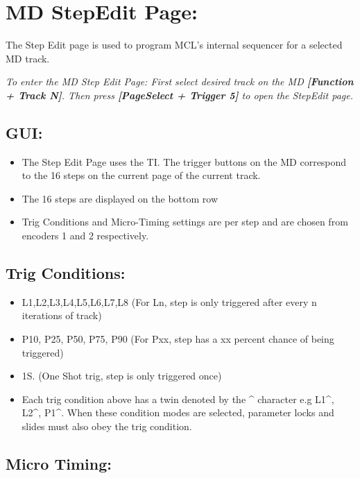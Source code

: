 \chapter{MD StepEdit Page:}

The Step Edit page is used to program MCL's internal sequencer for a selected MD track. 

\textit{To enter the MD Step Edit Page: First select desired track on the MD \textbf{[Function + Track N]}. Then press \textbf{[PageSelect + Trigger 5]} to open the StepEdit page.}



\section{GUI:}
\begin{itemize}
\item The Step Edit Page uses the TI. The trigger buttons on the MD correspond to the 16 steps on the current page of the current track.
\item The 16 steps are displayed on the bottom row
\item Trig Conditions and Micro-Timing settings are per step and are chosen from encoders 1 and 2 respectively.
\end{itemize}

\section{Trig Conditions:}
\begin{itemize}
\item L1,L2,L3,L4,L5,L6,L7,L8 (For Ln, step is only triggered after every n iterations of track)
\item P10, P25, P50, P75, P90 (For Pxx, step has a xx percent chance of being triggered)
\item 1S. (One Shot trig, step is only triggered once)
\item Each trig condition above has a twin denoted by the \^{} character e.g L1\^{}, L2\^{}, P1\^{}. When these condition modes are selected, parameter locks and slides must also obey the trig condition.
\end{itemize}
\section{Micro Timing:}

